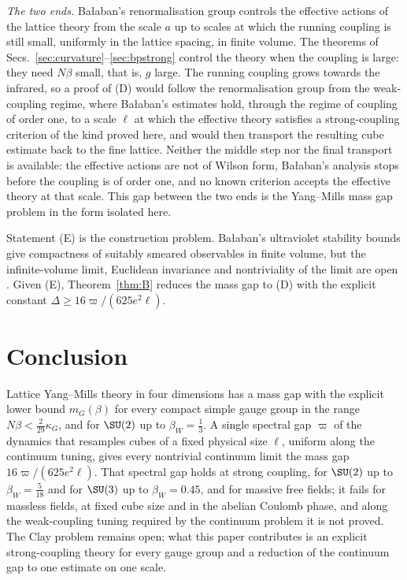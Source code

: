 \emph{The two ends.} Ba{\l}aban's renormalisation group
\cite{Bal84a,Bal85a,Bal89b} controls the effective actions of the lattice
theory from the scale $a$ up to scales at which the running coupling is still
small, uniformly in the lattice spacing, in finite volume. The theorems of
Secs.~\ref{sec:curvature}--\ref{sec:bpstrong} control the theory when the
coupling is large: they need $N\beta$ small, that is, $g$ large. The running
coupling grows towards the infrared, so a proof of (D) would follow the
renormalisation group from the weak-coupling regime, where Ba{\l}aban's
estimates hold, through the regime of coupling of order one, to a scale
$\ell$ at which the effective theory satisfies a strong-coupling criterion of
the kind proved here, and would then transport the resulting cube estimate
back to the fine lattice. Neither the middle step nor the final transport is
available: the effective actions are not of Wilson form, Ba{\l}aban's analysis
stops before the coupling is of order one, and no known criterion accepts the
effective theory at that scale. This gap between the two ends is the Yang--Mills
mass gap problem in the form isolated here.

Statement (E) is the construction problem. Ba{\l}aban's ultraviolet stability
bounds give compactness of suitably smeared observables in finite volume, but
the infinite-volume limit, Euclidean invariance and nontriviality of the limit
are open \cite{JW06}. Given (E), Theorem~\ref{thm:B} reduces the mass gap to
(D) with the explicit constant $\Delta\ge16\varpi/(625e^2\ell)$.

\section{Conclusion}\label{sec:conclusion}

Lattice Yang--Mills theory in four dimensions has a mass gap with the explicit
lower bound $m_G(\beta)$ for every compact simple gauge group in the range
$N\beta<\frac2{29}\kappa_G$, and for $\SU(2)$ up to $\beta_W=\frac13$. A single
spectral gap $\varpi$ of the dynamics that resamples cubes of a fixed physical
size $\ell$, uniform along the continuum tuning, gives every nontrivial
continuum limit the mass gap $16\varpi/(625e^2\ell)$. That spectral gap holds
at strong coupling, for $\SU(2)$ up to $\beta_W=\frac5{18}$ and for $\SU(3)$ up
to $\beta_W=0.45$, and for massive free fields; it fails for massless fields,
at fixed cube size and in the abelian Coulomb phase, and along the weak-coupling
tuning required by the continuum problem it is not proved. The Clay problem
remains open; what this paper contributes is an explicit strong-coupling
theory for every gauge group and a reduction of the continuum gap to one
estimate on one scale.

